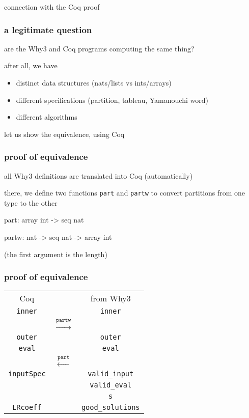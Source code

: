 \documentclass{beamer}
\let\emph\alert
\begin{document}
\begin{frame}
  \begin{center}
    \emph{connection with the Coq proof} \\
    \hrulefill
  \end{center}
\end{frame}

\begin{frame}\frametitle{a legitimate question}
  are the Why3 and Coq programs computing the same thing?

  \bigskip
  after all, we have
  \begin{itemize}
  \item distinct data structures (nats/lists vs ints/arrays)
  \item different specifications (partition, tableau, Yamanouchi word)
  \item different algorithms
  \end{itemize}

  \bigskip
  let us show the equivalence, using Coq
\end{frame}

\begin{frame}[fragile]\frametitle{proof of equivalence}
  all Why3 definitions are translated into Coq (automatically)

  \bigskip
  there, we define two functions \texttt{part} and \texttt{partw} to
  convert partitions from one type to the other

\begin{coq}
  part: array int -> seq nat
\end{coq}
\begin{coq}
  partw: nat -> seq nat -> array int
\end{coq}
(the first argument is the length)
\end{frame}

\begin{frame}\frametitle{proof of equivalence}
  \begin{center}
    \begin{tabular}{ccc}
      \emph{Coq} & & \emph{from Why3} \\[1em]
      \texttt{inner} & &       \texttt{inner} \\[-1em]
      & $\stackrel{\mathtt{partw}}{\longrightarrow}$
      & \\[-0.5em]
      \texttt{outer} & &\texttt{outer} \\
      \texttt{eval} & &       \texttt{eval} \\[-1.5em]
      & $\stackrel{\mathtt{part}}{\longleftarrow}$ & \\[1em]
      \texttt{inputSpec} & & \texttt{valid\_input} \\
                         & & \texttt{valid\_eval} \\
                         & & \texttt{s} \\
      \texttt{LRcoeff}   & & \texttt{good\_solutions}
    \end{tabular}
  \end{center}
\end{frame}
\end{document}
